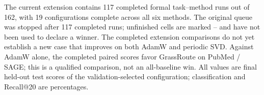 The current extension contains 117 completed formal task--method runs out of 162, with 19 configurations complete across all six methods. The original queue was stopped after 117 completed runs; unfinished cells are marked -- and have not been used to declare a winner. The completed extension comparisons do not yet establish a new case that improves on both AdamW and periodic SVD. Against AdamW alone, the completed paired scores favor GrassRoute on PubMed / SAGE; this is a qualified comparison, not an all-baseline win. All values are final held-out test scores of the validation-selected configuration; classification and Recall@20 are percentages.
